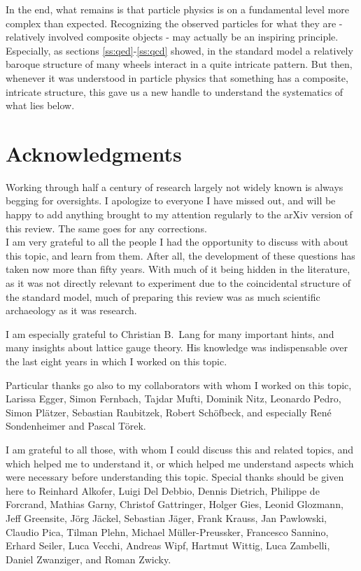\documentclass[final,twoside,12pt]{article}
\newcommand*{\1}{1\!\!\!\bot}
\begin{document}
In the end, what remains is that particle physics is on a fundamental level more complex than expected. Recognizing the observed particles for what they are - relatively involved composite objects - may actually be an inspiring principle. Especially, as sections \ref{ss:qed}-\ref{ss:qcd} showed, in the standard model a relatively baroque structure of many wheels interact in a quite intricate pattern. But then, whenever it was understood in particle physics that something has a composite, intricate structure, this gave us a new handle to understand the systematics of what lies below.

\section*{Acknowledgments}

Working through half a century of research largely not widely known is always begging for oversights. I apologize to everyone I have missed out, and will be happy to add anything brought to my attention regularly to the arXiv version of this review. The same goes for any corrections.\\

I am very grateful to all the people I had the opportunity to discuss with about this topic, and learn from them. After all, the development of these questions has taken now more than fifty years. With much of it being hidden in the literature, as it was not directly relevant to experiment due to the coincidental structure of the standard model, much of preparing this review was as much scientific archaeology as it was research.

I am especially grateful to Christian B.\ Lang for many important hints, and many insights about lattice gauge theory. His knowledge was indispensable over the last eight years in which I worked on this topic.

Particular thanks go also to my collaborators with whom I worked on this topic, Larissa Egger, Simon Fernbach, Tajdar Mufti, Dominik Nitz, Leonardo Pedro, Simon Pl\"atzer, Sebastian Raubitzek, Robert Sch\"ofbeck, and especially Ren\'e Sondenheimer and Pascal T\"orek.

I am grateful to all those, with whom I could discuss this and related topics, and which helped me to understand it, or which helped me understand aspects which were necessary before understanding this topic. Special thanks should be given here to Reinhard Alkofer, Luigi Del Debbio, Dennis Dietrich, Philippe de Forcrand, Mathias Garny, Christof Gattringer, Holger Gies, Leonid Glozmann, Jeff Greensite, J\"org J\"ackel, Sebastian J\"ager, Frank Krauss, Jan Pawlowski, Claudio Pica, Tilman Plehn, Michael M\"uller-Preussker, Francesco Sannino, Erhard Seiler, Luca Vecchi, Andreas Wipf, Hartmut Wittig, Luca Zambelli, Daniel Zwanziger, and Roman Zwicky.
\end{document}
